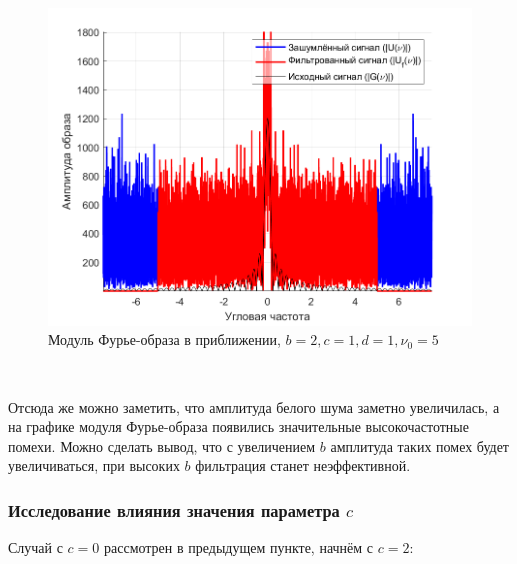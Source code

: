 \documentclass[a4paper]{article}
\begin{document}
\begin{figure}[H]
    \centering
    \includegraphics[width=0.5\linewidth]{part2/2_1_1_Fourier_scaled.png}
    \caption{Модуль Фурье-образа в приближении, $b = 2, c = 1, d = 1, \nu_0 = 5$}
\end{figure}\

Отсюда же можно заметить, что амплитуда белого шума заметно увеличилась, а на графике модуля Фурье-образа появились значительные высокочастотные помехи. Можно сделать вывод, что с увеличением $b$ амплитуда таких помех будет увеличиваться, при высоких $b$ фильтрация станет неэффективной.

\subsubsection{Исследование влияния значения параметра $c$}

Случай с $c = 0$ рассмотрен в предыдущем пункте, начнём с $c = 2$:
\end{document}
